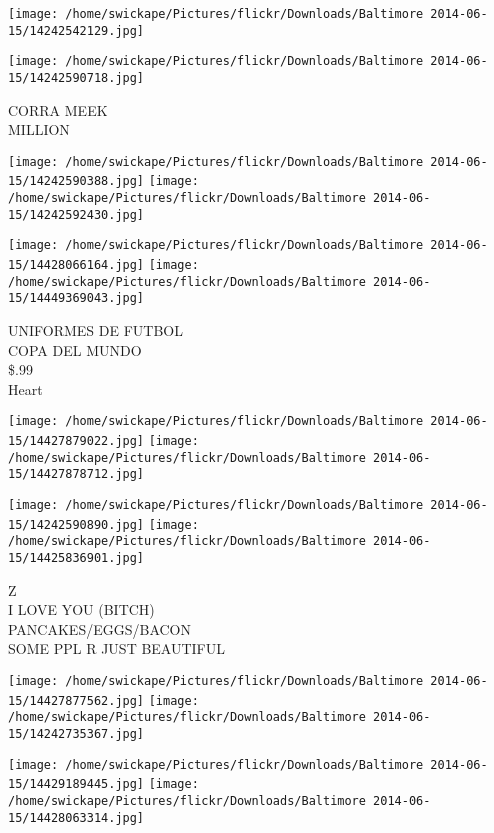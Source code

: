 \documentclass[10pt,letterpaper]{article}
\begin{document}
\texttt{[image: /home/swickape/Pictures/flickr/Downloads/Baltimore 2014-06-15/14242542129.jpg]}

\vspace{0.25in}
\texttt{[image: /home/swickape/Pictures/flickr/Downloads/Baltimore 2014-06-15/14242590718.jpg]}

CORRA MEEK\\
MILLION\\
\pagebreak

\texttt{[image: /home/swickape/Pictures/flickr/Downloads/Baltimore 2014-06-15/14242590388.jpg]}
\texttt{[image: /home/swickape/Pictures/flickr/Downloads/Baltimore 2014-06-15/14242592430.jpg]}

\texttt{[image: /home/swickape/Pictures/flickr/Downloads/Baltimore 2014-06-15/14428066164.jpg]}
\texttt{[image: /home/swickape/Pictures/flickr/Downloads/Baltimore 2014-06-15/14449369043.jpg]}

UNIFORMES DE FUTBOL\\
COPA DEL MUNDO\\
\$.99\\
Heart\\
\pagebreak

\texttt{[image: /home/swickape/Pictures/flickr/Downloads/Baltimore 2014-06-15/14427879022.jpg]}
\texttt{[image: /home/swickape/Pictures/flickr/Downloads/Baltimore 2014-06-15/14427878712.jpg]}

\texttt{[image: /home/swickape/Pictures/flickr/Downloads/Baltimore 2014-06-15/14242590890.jpg]}
\texttt{[image: /home/swickape/Pictures/flickr/Downloads/Baltimore 2014-06-15/14425836901.jpg]}

Z\\
I LOVE YOU (BITCH)\\
PANCAKES/EGGS/BACON\\
SOME PPL R JUST BEAUTIFUL\\
\pagebreak

\texttt{[image: /home/swickape/Pictures/flickr/Downloads/Baltimore 2014-06-15/14427877562.jpg]}
\texttt{[image: /home/swickape/Pictures/flickr/Downloads/Baltimore 2014-06-15/14242735367.jpg]}

\texttt{[image: /home/swickape/Pictures/flickr/Downloads/Baltimore 2014-06-15/14429189445.jpg]}
\texttt{[image: /home/swickape/Pictures/flickr/Downloads/Baltimore 2014-06-15/14428063314.jpg]}
\end{document}
